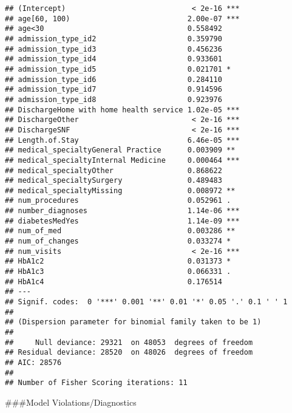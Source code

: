 \documentclass[
]{article}
\begin{document}
\begin{verbatim}
## (Intercept)                             < 2e-16 ***
## age[60, 100)                           2.00e-07 ***
## age<30                                 0.558492    
## admission_type_id2                     0.359790    
## admission_type_id3                     0.456236    
## admission_type_id4                     0.933601    
## admission_type_id5                     0.021701 *  
## admission_type_id6                     0.284110    
## admission_type_id7                     0.914596    
## admission_type_id8                     0.923976    
## DischargeHome with home health service 1.02e-05 ***
## DischargeOther                          < 2e-16 ***
## DischargeSNF                            < 2e-16 ***
## Length.of.Stay                         6.46e-05 ***
## medical_specialtyGeneral Practice      0.003909 ** 
## medical_specialtyInternal Medicine     0.000464 ***
## medical_specialtyOther                 0.868622    
## medical_specialtySurgery               0.489483    
## medical_specialtyMissing               0.008972 ** 
## num_procedures                         0.052961 .  
## number_diagnoses                       1.14e-06 ***
## diabetesMedYes                         1.14e-09 ***
## num_of_med                             0.003286 ** 
## num_of_changes                         0.033274 *  
## num_visits                              < 2e-16 ***
## HbA1c2                                 0.031373 *  
## HbA1c3                                 0.066331 .  
## HbA1c4                                 0.176514    
## ---
## Signif. codes:  0 '***' 0.001 '**' 0.01 '*' 0.05 '.' 0.1 ' ' 1
## 
## (Dispersion parameter for binomial family taken to be 1)
## 
##     Null deviance: 29321  on 48053  degrees of freedom
## Residual deviance: 28520  on 48026  degrees of freedom
## AIC: 28576
## 
## Number of Fisher Scoring iterations: 11
\end{verbatim}

\#\#\#Model Violations/Diagnostics
\end{document}
